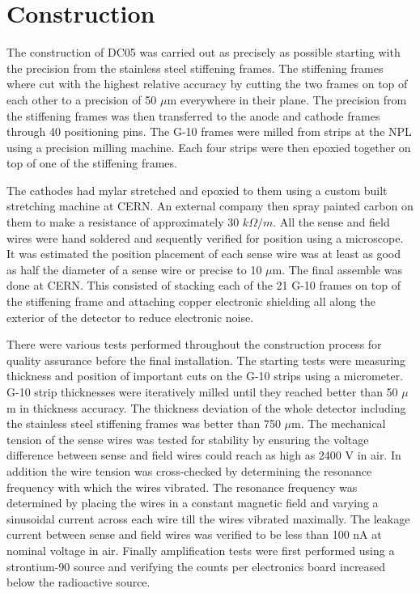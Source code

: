\section{Construction}
The construction of DC05 was carried out as precisely as possible starting with
the precision from the stainless steel stiffening frames.  The stiffening frames
where cut with the highest relative accuracy by cutting the two frames on top of
each other to a precision of 50 $\mu$m everywhere in their plane.  The precision
from the stiffening frames was then transferred to the anode and cathode frames
through 40 positioning pins.  The G-10 frames were milled from strips at the NPL
using a precision milling machine.  Each four strips were then epoxied together
on top of one of the stiffening frames.  \par The cathodes had mylar stretched
and epoxied to them using a custom built stretching machine at CERN.  An
external company then spray painted carbon on them to make a resistance of
approximately 30 $k\Omega /m$.  All the sense and field wires were hand soldered
and sequently verified for position using a microscope.  It was estimated the
position placement of each sense wire was at least as good as half the diameter
of a sense wire or precise to 10 $\mu$m.  The final assemble was done at CERN.
This consisted of stacking each of the 21 G-10 frames on top of the stiffening
frame and attaching copper electronic shielding all along the exterior of the
detector to reduce electronic noise. \par There were various tests performed
throughout the construction process for quality assurance before the final
installation.  The starting tests were measuring thickness and position of
important cuts on the G-10 strips using a micrometer.  G-10 strip thicknesses
were iteratively milled until they reached better than 50 $\mu$m in thickness
accuracy.  The thickness deviation of the whole detector including the stainless
steel stiffening frames was better than 750 $\mu$m.  The mechanical tension of
the sense wires was tested for stability by ensuring the voltage difference
between sense and field wires could reach as high as 2400 V in air.  In addition
the wire tension was cross-checked by determining the resonance frequency with
which the wires vibrated.  The resonance frequency was determined by placing the
wires in a constant magnetic field and varying a sinusoidal current across each
wire till the wires vibrated maximally.  The leakage current between sense and
field wires was verified to be less than 100 nA at nominal voltage in air.
Finally amplification tests were first performed using a strontium-90 source and
verifying the counts per electronics board increased below the radioactive
source.

